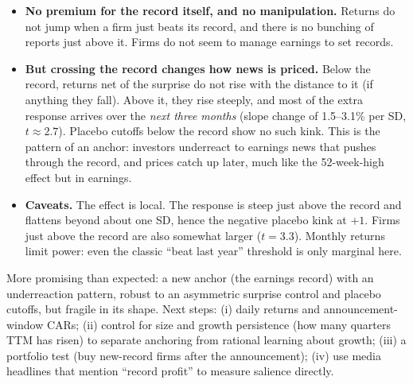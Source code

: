 \begin{itemize}
\item \textbf{No premium for the record itself, and no manipulation.} Returns do not jump when a firm just beats its
  record, and there is no bunching of reports just above it. Firms do not seem to manage earnings to set records.
\item \textbf{But crossing the record changes how news is priced.} Below the record, returns net of the surprise do not
  rise with the distance to it (if anything they fall). Above it, they rise steeply, and most of the extra response arrives over the
  \emph{next three months} (slope change of 1.5--3.1\% per SD, $t\approx2.7$). Placebo cutoffs below the record show
  no such kink. This is the pattern of an anchor: investors underreact to earnings news that pushes through the
  record, and prices catch up later, much like the 52-week-high effect but in earnings.
\item \textbf{Caveats.} The effect is local. The response is steep just above the record and flattens beyond about
  one SD, hence the negative placebo kink at $+1$. Firms just above the record are also somewhat larger ($t=3.3$).
  Monthly returns limit power: even the classic ``beat last year'' threshold is only marginal here.
\end{itemize}

More promising than expected: a new anchor (the earnings record) with an underreaction pattern, robust to an
asymmetric surprise control and placebo cutoffs, but fragile in its shape. Next steps: (i) daily returns and
announcement-window CARs; (ii) control for size and growth persistence (how many quarters TTM has risen) to separate
anchoring from rational learning about growth; (iii) a portfolio test (buy new-record firms after the announcement);
(iv) use media headlines that mention ``record profit'' to measure salience directly.

